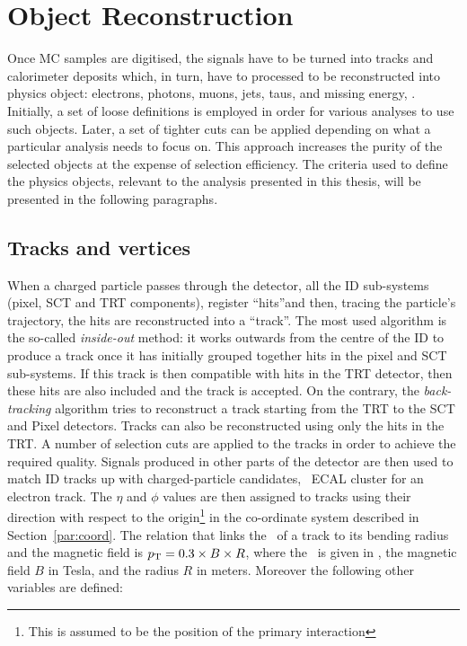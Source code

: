 	\section{Object Reconstruction}
	\label{sec:objReco}

		Once \ac{MC} samples are digitised, the signals have to be turned into tracks and calorimeter deposits which, in turn, have to processed to be reconstructed into physics object: electrons, photons, muons, jets, taus, and missing energy, \met. Initially, a set of loose definitions is employed in order for various analyses to use such objects. Later, a set of tighter cuts can be applied depending on what a particular analysis needs to focus on. This approach increases the purity of the selected objects at the expense of selection efficiency. The criteria used to define the physics objects, relevant to the analysis presented in this thesis, will be presented in the following paragraphs.


		\subsection*{Tracks and vertices}

			When a charged particle passes through the detector, all the \ac{ID} sub-systems (pixel, \ac{SCT} and \ac{TRT} components), register ``hits''and then, tracing the particle's trajectory, the hits are reconstructed into a ``track''. The most used algorithm is the so-called \emph{inside-out} method: it works outwards from the centre of the \ac{ID} to produce a track once it has initially grouped together hits in the pixel and \ac{SCT} sub-systems. If this track is then compatible with hits in the \ac{TRT} detector, then these hits are also included and the track is accepted. On the contrary, the \emph{back-tracking} algorithm tries to reconstruct a track starting from the \ac{TRT} to the \ac{SCT} and Pixel detectors. Tracks can also be reconstructed using only the hits in the \ac{TRT}. A number of selection cuts are applied to the tracks in order to achieve the required quality. Signals produced in other parts of the detector are then used to match \ac{ID} tracks up with charged-particle candidates, \eg\ \ac{ECAL} cluster for an electron track. The $\eta$ and $\phi$ values are then assigned to tracks using their direction with respect to the origin\footnote{This is assumed to be the position of the primary interaction} in the co-ordinate system described in Section~\ref{par:coord}. The relation that links the \pt\ of a track to its bending radius and the magnetic field is $p_{\mathrm{T}} = 0.3 \times B \times R$, where the \pt\ is given in \GeV, the magnetic field $B$ in Tesla, and the radius $R$ in meters. Moreover the following other variables are defined:

